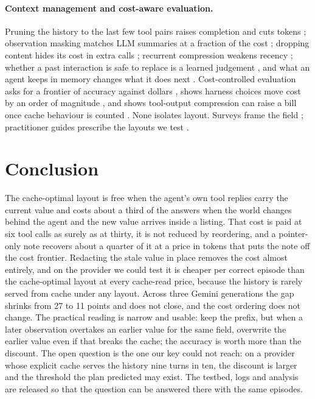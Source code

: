 \paragraph{Context management and cost-aware evaluation.} Pruning the history to the last few tool pairs raises completion and cuts tokens \citep{a2606_10209}; observation masking matches LLM summaries at a fraction of the cost \citep{a2508_21433,a2605_18854}; dropping content hides its cost in extra calls \citep{a2608_16370}; recurrent compression weakens recency \citep{a2608_06503}; whether a past interaction is safe to replace is a learned judgement \citep{a2609_27298,a2609_26779}, and what an agent keeps in memory changes what it does next \citep{a2505_16067}. Cost-controlled evaluation asks for a frontier of accuracy against dollars \citep{a2407_01502,a2504_13359,a2510_11977}, shows harness choices move cost by an order of magnitude \citep{a2607_06906,a2607_22585,a2610_04433}, and shows tool-output compression can raise a bill once cache behaviour is counted \citep{a2607_12161}. None isolates layout. Surveys frame the field \citep{a2510_26493,a2507_13334}; practitioner guides prescribe the layouts we test \citep{manus2025,anthropic2025context,bouchard2026}.

\section{Conclusion}
\label{sec:conclusion}

The cache-optimal layout is free when the agent's own tool replies carry the current value and costs about a third of the answers when the world changes behind the agent and the new value arrives inside a listing. That cost is paid at six tool calls as surely as at thirty, it is not reduced by reordering, and a pointer-only note recovers about a quarter of it at a price in tokens that puts the note off the cost frontier. Redacting the stale value in place removes the cost almost entirely, and on the provider we could test it is cheaper per correct episode than the cache-optimal layout at every cache-read price, because the history is rarely served from cache under any layout. Across three Gemini generations the gap shrinks from 27 to 11 points and does not close, and the cost ordering does not change. The practical reading is narrow and usable: keep the prefix, but when a later observation overtakes an earlier value for the same field, overwrite the earlier value even if that breaks the cache; the accuracy is worth more than the discount. The open question is the one our key could not reach: on a provider whose explicit cache serves the history nine turns in ten, the discount is larger and the threshold the plan predicted may exist. The testbed, logs and analysis are released so that the question can be answered there with the same episodes.

